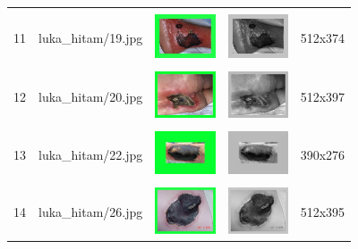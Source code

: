 \begin{table}[H]
\begin{tabular}{|m{0.2in}|m{1.2in}|m{0.7in}|m{0.7in}|m{0.7in}|}
		& &  &  &\\
		11& 
		luka\_hitam/19.jpg &
		\includegraphics[width=0.7in]{dataset/dataset_3/luka_hitam/ready/19.jpg}&
		\includegraphics[width=0.7in]{dataset/dataset_3/luka_hitam/ready/19_gray.jpg}&
		512x374\\
		\hline
		
		& &  &  &\\
		12& 
		luka\_hitam/20.jpg &
		\includegraphics[width=0.7in]{dataset/dataset_3/luka_hitam/ready/20.jpg}&
		\includegraphics[width=0.7in]{dataset/dataset_3/luka_hitam/ready/20_gray.jpg}&
		512x397\\
		\hline
		
		& &  &  &\\
		13& 
		luka\_hitam/22.jpg &
		\includegraphics[width=0.7in]{dataset/dataset_3/luka_hitam/ready/22.jpg}&
		\includegraphics[width=0.7in]{dataset/dataset_3/luka_hitam/ready/22_gray.jpg}&
		390x276\\
		\hline
		
		& &  &  &\\
		14& 
		luka\_hitam/26.jpg &
		\includegraphics[width=0.7in]{dataset/dataset_3/luka_hitam/ready/26.jpg}&
		\includegraphics[width=0.7in]{dataset/dataset_3/luka_hitam/ready/26_gray.jpg}&
		512x395\\
		\hline
	\end{tabular}
\end{table}

